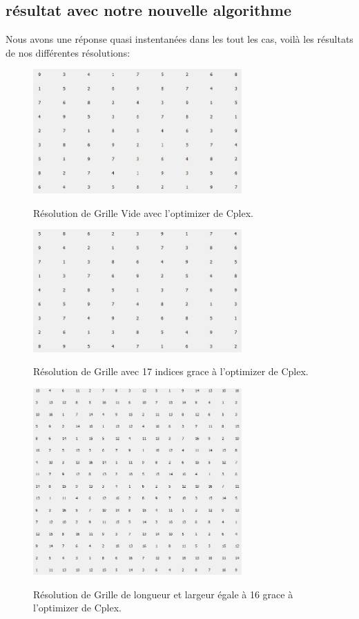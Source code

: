 \subsection{résultat avec notre nouvelle algorithme}
Nous avons une réponse quasi instentanées dans les tout les cas, voilà les résultats de nos différentes résolutions:

\begin{figure}[h]
  \begin{center}
\includegraphics[width=8cm]{./images/Res_Vide.png}\label{Test_Cplex}
\caption{Résolution de Grille Vide avec l'optimizer de Cplex.}
\end{center}
\end{figure}

\begin{figure}[h]
  \begin{center}
\includegraphics[width=8cm]{./images/Res_17.png}\label{Test_Cplex_17}
\caption{Résolution de Grille avec 17 indices grace à l'optimizer de Cplex.}
\end{center}
\end{figure}


\begin{figure}[h]
  \begin{center}
\includegraphics[width=8cm]{./images/Resultat_16_Cplex.png}\label{Test_Cplex_16_16}
\caption{Résolution de Grille de longueur et largeur égale à 16 grace à l'optimizer de Cplex.}
\end{center}
\end{figure}
\newpage
